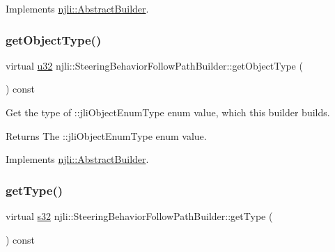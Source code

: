 Implements \mbox{\hyperlink{classnjli_1_1_abstract_builder_a902f73ea78031b06aca183a417f3413b}{njli\+::\+Abstract\+Builder}}.

\mbox{\label{classnjli_1_1_steering_behavior_follow_path_builder_a50a99ba499b7302d16ab1d5f87741222}} 
\subsubsection{\texorpdfstring{get\+Object\+Type()}{getObjectType()}}
{\footnotesize\ttfamily virtual \mbox{\hyperlink{_util_8h_a10e94b422ef0c20dcdec20d31a1f5049}{u32}} njli\+::\+Steering\+Behavior\+Follow\+Path\+Builder\+::get\+Object\+Type (\begin{DoxyParamCaption}{ }\end{DoxyParamCaption}) const\hspace{0.3cm}{\ttfamily [virtual]}}

Get the type of \+::jli\+Object\+Enum\+Type enum value, which this builder builds.

\begin{DoxyReturn}{Returns}
The \+::jli\+Object\+Enum\+Type enum value. 
\end{DoxyReturn}


Implements \mbox{\hyperlink{classnjli_1_1_abstract_builder_a0f2d344fcf697b167f4f2b1122b5fb33}{njli\+::\+Abstract\+Builder}}.

\mbox{\label{classnjli_1_1_steering_behavior_follow_path_builder_af831b193fb89d58cc9cca762c3590392}} 
\subsubsection{\texorpdfstring{get\+Type()}{getType()}}
{\footnotesize\ttfamily virtual \mbox{\hyperlink{_util_8h_aa62c75d314a0d1f37f79c4b73b2292e2}{s32}} njli\+::\+Steering\+Behavior\+Follow\+Path\+Builder\+::get\+Type (\begin{DoxyParamCaption}{ }\end{DoxyParamCaption}) const\hspace{0.3cm}{\ttfamily [virtual]}}

